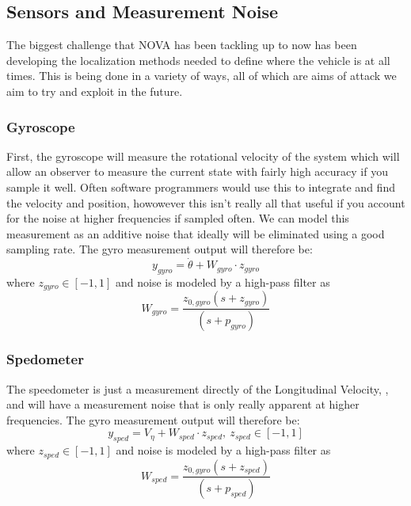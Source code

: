 \documentclass[conference, onecolumn]{IEEEtran}
\begin{document}
\newpage
\subsection{Sensors and Measurement Noise}
The biggest challenge that NOVA has been tackling up to now has been developing the localization methods needed to define where the vehicle is at all times. 
This is being done in a variety of ways, all of which are aims of attack we aim to try and exploit in the future. 

\subsubsection{Gyroscope}
First, the gyroscope will measure the rotational velocity of the system which will allow an observer to measure the current state with fairly high accuracy if you sample it well. 
Often software programmers would use this to integrate and find the velocity and position, howowever this isn't really all that useful if you account for the noise at higher frequencies if sampled often.
We can model this measurement as an additive noise that ideally will be eliminated using a good sampling rate.
The gyro measurement output will therefore be:\[
    y_{gyro} = \dot{\theta} + W_{gyro} \cdot z_{gyro}
\] where $z_{gyro} \in [-1,1]$ and noise is modeled by a high-pass filter as\[
    W_{gyro} = \frac{z_{0,gyro} (s + z_{gyro})}{(s+p_{gyro})}
\]

\subsubsection{Spedometer}
The speedometer is just a measurement directly of the Longitudinal Velocity, , and will have a measurement noise that is only really apparent at higher frequencies.
The gyro measurement output will therefore be:\[
    y_{sped} = V_{\eta}  + W_{sped} \cdot z_{sped}, \ z_{sped} \in [-1,1]
\] where $z_{sped} \in [-1,1]$ and noise is modeled by a high-pass filter as\[
    W_{sped} = \frac{z_{0,gyro} (s + z_{sped})}{(s+p_{sped})}
\] 
\end{document}
